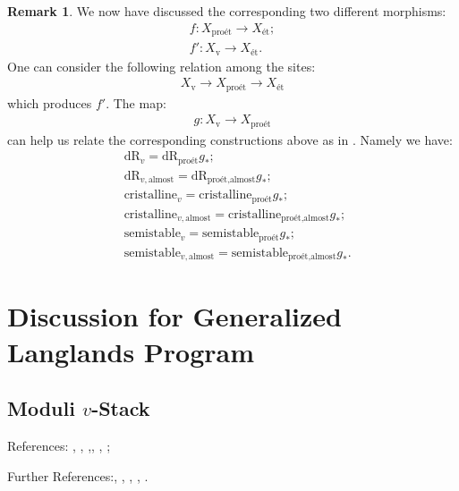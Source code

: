 \documentclass[12pt]{book}
\theoremstyle{definition}
\newtheorem{remark}{Remark}
\begin{document}
\begin{remark}
We now have discussed the corresponding two different morphisms:
\begin{align}
f: X_\text{pro\'et}\longrightarrow X_\text{\'et};\\
f': X_\text{v}\longrightarrow X_\text{\'et}.
\end{align}
One can consider the following relation among the sites:
\begin{align}
X_\text{v}\longrightarrow X_\text{pro\'et}\longrightarrow X_\text{\'et}
\end{align}
which produces $f'$. The map:
\begin{align}
g: X_\text{v}\longrightarrow X_\text{pro\'et}
\end{align}
can help us relate the corresponding constructions above as in \cite[Proposition 2.37]{B}. Namely we have:
\begin{align}
&\mathrm{dR}_{v}=\mathrm{dR}_{\text{pro\'et}}g_*;\\
&\mathrm{dR}_{v,\text{almost}}=\mathrm{dR}_{\text{pro\'et},\text{almost}}g_*;\\
&\mathrm{cristalline}_{v}=\mathrm{cristalline}_{\text{pro\'et}}g_*;\\
&\mathrm{cristalline}_{v,\text{almost}}=\mathrm{cristalline}_{\text{pro\'et},\text{almost}}g_*;\\
&\mathrm{semistable}_{v}=\mathrm{semistable}_{\text{pro\'et}}g_*;\\
&\mathrm{semistable}_{v,\text{almost}}=\mathrm{semistable}_{\text{pro\'et},\text{almost}}g_*.
\end{align} 
\end{remark}










\chapter{Discussion for Generalized Langlands Program}

\newpage
\section{Moduli $v$-Stack}

\noindent References: \cite{FS}, \cite{FF}, \cite{Sch1},\cite{Sch2}, \cite{KL1}, \cite{KL2};

\noindent Further References:\cite{Lan1}, \cite{Drin1}, \cite{Drin2}, \cite{Zhu}, \cite{DHKM}.\\
\end{document}
